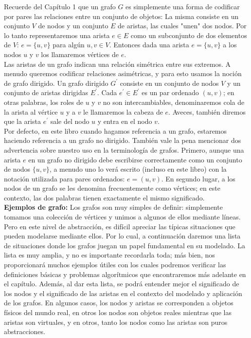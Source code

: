 \documentclass[a4paper, 12pt]{book}
\begin{document}
Recuerde del Capítulo 1 que un grafo $G$ es simplemente una forma de codificar por pares las
relaciones entre un conjunto de objetos: La misma consiste en un conjunto $V$ de nodos
y un conjunto $E$ de aristas, las cuales "unen" dos nodos. Por lo tanto
representaremos una arista $e \in E$ como un subconjunto de dos elementos de $V$: $e = \{u, v\}$ para algún $u, v \in V$.  Entonces dada una arista  $e = \{u, v\}$ a los nodos $u$ y $v$ los llamaremos vértices de $e$.\\

Las aristas de un grafo indican una relación simétrica entre sus extremos.
A menudo queremos codificar relaciones asimétricas, y para esto usamos la
noción de grafo dirigido. Un grafo dirigido $G^{'}$ consiste en un conjunto
de nodos $V$ y un conjunto de aristas dirigidas $E^{'}$.  Cada $e^{'} \in E^{'}$ es un par ordenado $(u, v)$; en otras palabras, los roles de $u$ y $v$ no son intercambiables,   denominaremos cola de la arista al vértice $u$ y a $v$ le llamaremos la cabeza de $e$. Aveces, también diremos que la arista $e^{'}$ sale del nodo $u$ y entra en el nodo $v$. \\

Por defecto, en este libro cuando hagamos referencia a un grafo, estaremos haciendo referencia a un grafo no dirigido. También vale la pena mencionar dos advertencia sobre nuestro uso en la terminología de grafos. Primero, aunque una arista $e$ en un grafo no dirigido debe escribirse correctamente como un conjunto de nodos $\{u, v\}$,  a menudo uno lo verá escrito (incluso en este libro) con la notación utilizada para pares ordenados: $e = (u,v)$. En segundo lugar, a los nodos de un grafo se les denomina frecuentemente como vértices; en este contexto, las dos palabras tienen exactamente el mismo significado.  \\

\textbf{Ejemplos de grafo:} Los grafos son muy simples de definir: simplemente tomamos una colección
de vértices y unimos a algunos de ellos mediante líneas. Pero en este nivel de abstracción,
es difícil apreciar las típicas situaciones que pueden modelarse mediante ellos. Por lo cual, a continuación daremos una lista de situaciones donde los grafos juegan un papel fundamental en su modelado. La lista es muy amplia, y no es importante recordarla toda; más bien, nos proporcionará muchos ejemplos útiles con los cuales podremos verificar las definiciones básicas y problemas algorítmicos que encontraremos más adelante en el capítulo. Además, al dar esta lista, se podrá entender mejor el significado de los nodos y el significado de las aristas en
el contexto del modelado y aplicación de los grafos. En algunos casos, los nodos y aristas se corresponden a objetos físicos del mundo real, en otros los nodos son objetos reales
mientras que las aristas son virtuales, y en otros, tanto los nodos como las aristas son puros
abstracciones. \\
\end{document}
